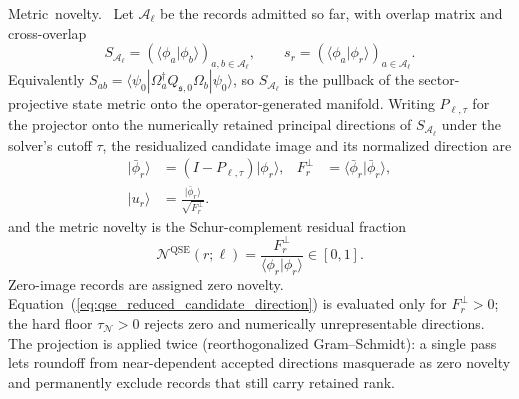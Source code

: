 \documentclass[
  reprint,
  amsmath,
  amssymb,
  aps,
  pra,
  nofootinbib,
  superscriptaddress,
  floatfix
]{revtex4-2}
\newcommand{\tentative}[1]{\textcolor{red!70!black}{#1}}
\newcommand{\structlabel}[1]{\noindent\mbox{\tentative{#1.}}~}
\newcommand{\Acal}{\mathcal{A}}
\newcommand{\Ncal}{\mathcal{N}}
\newcommand{\qse}{\mathrm{QSE}}
\newcommand{\ket}[1]{|#1\rangle}
\newcommand{\bra}[1]{\langle #1|}
\newcommand{\braket}[2]{\langle #1|#2\rangle}
\begin{document}
\structlabel{Metric novelty}
Let $\Acal_\ell$ be the records admitted so far, with overlap matrix and cross-overlap
\begin{equation}
S_{\Acal_\ell}=(\braket{\phi_a}{\phi_b})_{a,b\in\Acal_\ell},
\qquad
s_r=(\braket{\phi_a}{\phi_r})_{a\in\Acal_\ell}.
\label{eq:qse_overlap_parts}
\end{equation}
Equivalently $S_{ab}=\bra{\psi_0}\Omega_a^\dagger Q_{\mathfrak s,0}\Omega_b\ket{\psi_0}$, so $S_{\Acal_\ell}$ is the pullback of the sector-projective state metric onto the operator-generated manifold.  Writing $P_{\ell,\tau}$ for the projector onto the numerically retained principal directions of $S_{\Acal_\ell}$ under the solver's cutoff $\tau$, the residualized candidate image and its normalized direction are
\begin{equation}
\begin{aligned}
\ket{\bar\phi_r}&=(I-P_{\ell,\tau})\ket{\phi_r},
&
F_r^\perp&=\braket{\bar\phi_r}{\bar\phi_r},
\\
\ket{u_r}&=\frac{\ket{\bar\phi_r}}{\sqrt{F_r^\perp}}.
\end{aligned}
\label{eq:qse_reduced_candidate_direction}
\end{equation}
and the metric novelty is the Schur-complement residual fraction
\begin{equation}
\Ncal^{\qse}(r;\ell)=\frac{F_r^\perp}{\braket{\phi_r}{\phi_r}}\in[0,1].
\label{eq:qse_phase2_novelty}
\end{equation}
Zero-image records are assigned zero novelty.  Equation~(\ref{eq:qse_reduced_candidate_direction}) is evaluated only for $F_r^\perp>0$; the hard floor $\tau_{\Ncal}>0$ rejects zero and numerically unrepresentable directions.  The projection is applied twice (reorthogonalized Gram--Schmidt): a single pass lets roundoff from near-dependent accepted directions masquerade as zero novelty and permanently exclude records that still carry retained rank.
\end{document}
